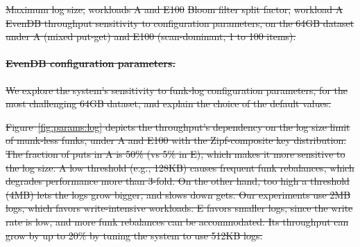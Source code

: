 \documentclass[sigplan,10pt]{acmart}
\newcommand{\sys}{EvenDB}
\providecommand{\DIFdel}[1]{{\protect\color{red}\sout{#1}}}                      %
\providecommand{\DIFdelFL}[1]{\DIFdel{#1}} %
\begin{document}
{%
\DIFdelFL{Maximum log size,}%
\DIFdelFL{workloads A and E100}}
{%
\DIFdelFL{Bloom filter split factor,}%
\DIFdelFL{workload A}}
{%
\DIFdelFL{\sys\/ throughput sensitivity to configuration parameters, on the 64GB dataset under  A (mixed put-get) and 
E100 (scan-dominant, 1 to 100 items).}%
}

\paragraph{\DIFdel{\sys\/ configuration parameters.}} 
\addtocounter{paragraph}{-1}%
\DIFdel{We explore the system's  sensitivity to funk-log configuration parameters, for the most challenging 64GB dataset, 
and explain the choice of the default values.
}%

\DIFdel{Figure~\ref{fig:params:log} depicts the throughput's dependency on the log size limit of munk-less funks, 
under  A and E100  with the Zipf-composite key distribution. 
The fraction of puts in A is 50\% (vs 5\% in E), which makes it more sensitive to the log size. 
A low threshold (e.g., 128KB) causes frequent funk rebalances, which degrades performance more than 3-fold. 
On the other hand, too high a threshold (4MB) lets the logs grow bigger, and slows down gets. Our experiments  
use 2MB logs, which favors write-intensive workloads. E favors smaller logs, since the write 
rate is low, and more funk rebalances can be accommodated. Its throughput can  grow by up to 20\% 
by tuning the system to use 512KB logs.
}%
\end{document}
